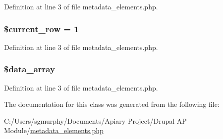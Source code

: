 Definition at line 3 of file metadata\_\-elements.php.

\hypertarget{classmetadata__elements_a2ec3a266ee95cda75cdbb71bc9ee1b53}{
\subsubsection[{\$current\_\-row}]{\setlength{\rightskip}{0pt plus 5cm}\$current\_\-row = 1}}
\label{classmetadata__elements_a2ec3a266ee95cda75cdbb71bc9ee1b53}


Definition at line 3 of file metadata\_\-elements.php.

\hypertarget{classmetadata__elements_a1a4843ada02b238f638d513eda265207}{
\subsubsection[{\$data\_\-array}]{\setlength{\rightskip}{0pt plus 5cm}\$data\_\-array}}
\label{classmetadata__elements_a1a4843ada02b238f638d513eda265207}


Definition at line 3 of file metadata\_\-elements.php.



The documentation for this class was generated from the following file:\begin{DoxyCompactItemize}
\item 
C:/Users/sgmurphy/Documents/Apiary Project/Drupal AP Module/\hyperlink{metadata__elements_8php}{metadata\_\-elements.php}\end{DoxyCompactItemize}
